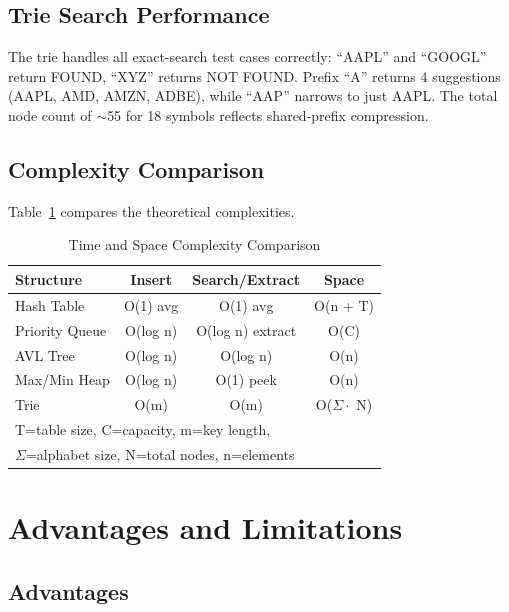 \documentclass[conference]{IEEEtran}
\begin{document}
\subsection{Trie Search Performance}

The trie handles all exact-search test cases correctly: ``AAPL'' and ``GOOGL'' return FOUND, ``XYZ'' returns NOT FOUND. Prefix ``A'' returns 4 suggestions (AAPL, AMD, AMZN, ADBE), while ``AAP'' narrows to just AAPL. The total node count of $\sim$55 for 18 symbols reflects shared-prefix compression.

\subsection{Complexity Comparison}

Table~\ref{tab:complexity} compares the theoretical complexities.

\begin{table}[htbp]
\caption{Time and Space Complexity Comparison}
\begin{center}
\begin{tabular}{|l|c|c|c|}
\hline
\textbf{Structure} & \textbf{Insert} & \textbf{Search/Extract} & \textbf{Space} \\
\hline
Hash Table & O(1) avg & O(1) avg & O(n + T) \\
Priority Queue & O(log n) & O(log n) extract & O(C) \\
AVL Tree & O(log n) & O(log n) & O(n) \\
Max/Min Heap & O(log n) & O(1) peek & O(n) \\
Trie & O(m) & O(m) & O($\Sigma \cdot$ N) \\
\hline
\multicolumn{4}{l}{\footnotesize T=table size, C=capacity, m=key length,} \\
\multicolumn{4}{l}{\footnotesize $\Sigma$=alphabet size, N=total nodes, n=elements} \\
\end{tabular}
\label{tab:complexity}
\end{center}
\end{table}

\section{Advantages and Limitations}

\subsection{Advantages}
\end{document}
